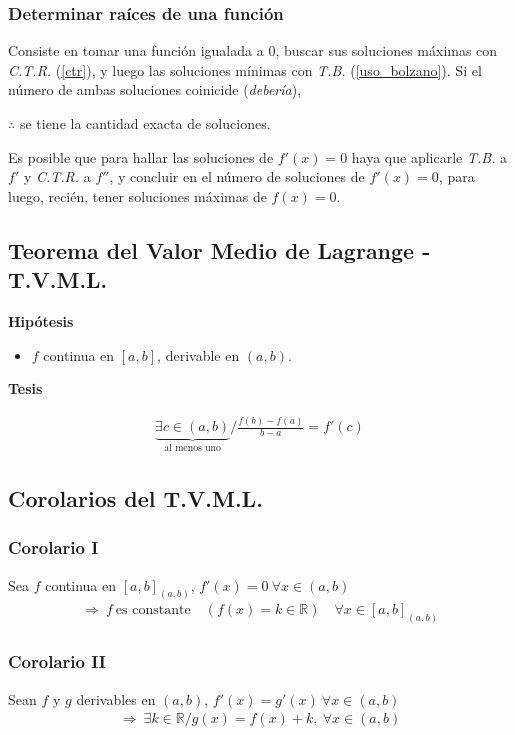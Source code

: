 \documentclass[11pt,titlepage]{article}
\newcommand{\littleTitle}[1]{
	\noindent \ignorespaces
	\small \textbf{#1} \normalsize
	\ignorespaces \ignorespacesafterend
}
\begin{document}
\subsubsection{Determinar raíces de una función}
Consiste en tomar una función igualada a $0$, buscar sus soluciones máximas con \emph{C.T.R.} (\ref{ctr}), y luego 
las soluciones mínimas con \emph{T.B.} (\ref{uso_bolzano}). Si el número de ambas soluciones coinicide (\emph{debería}), 
\begin{center}
	$\therefore$ se tiene la cantidad exacta de soluciones.
\end{center} \par
Es posible que para hallar las soluciones de $f'(x) = 0$ haya que aplicarle \emph{T.B.} a $f'$ y \emph{C.T.R.} 
a $f''$, y concluir en el número de soluciones de $f'(x) = 0$, para luego, recién, tener soluciones máximas de 
$f(x) = 0$.

\subsection{Teorema del Valor Medio de Lagrange - T.V.M.L.} \label{tvml}
\begin{commBoxy}
	\littleTitle{Hipótesis}
	\begin{itemize}
		\item $f$ continua en $[a,b]$, derivable en $(a,b)$.
	\end{itemize}

	\littleTitle{Tesis}
	\begin{gather*}
		\underbrace{\exists c \in (a,b)}_{\text{al menos uno}} / \frac{f(b) - f(a)}{b - a} = f'(c) 
	\end{gather*}
\end{commBoxy}

\subsection{Corolarios del T.V.M.L.}
\subsubsection{Corolario I}
Sea $f$ continua en ${[a,b]}_{(a,b)}$, $f'(x) = 0 \ \forall x \in (a,b)$
\begin{gather*}
	\Rightarrow \ f \ \text{es constante} \quad (f(x) = k \in \mathbb{R}) \quad \forall x \in {[a,b]}_{(a,b)}
\end{gather*}

\subsubsection{Corolario II}
Sean $f$ y $g$ derivables en $(a,b)$, $f'(x) = g'(x) \ \forall x \in (a,b)$
\begin{gather*}
	\Rightarrow \ \exists k \in \mathbb{R} / g(x) = f(x) + k, \ \forall x \in (a,b)
\end{gather*}
\end{document}
